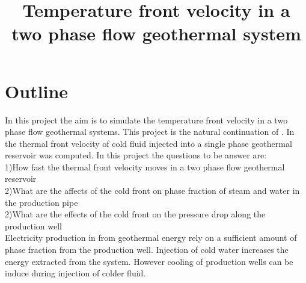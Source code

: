 \documentclass[
10pt, %
a4paper, %
oneside, %
headinclude,footinclude, %
BCOR5mm, %
]{scrartcl}
\title{Temperature front velocity in a two phase flow geothermal system} %
\author{\spacedlowsmallcaps{Yapi Donatien Achou}} %
\date{} %
\begin{document}

\renewcommand{\sectionmark}[1]{\markright{\spacedlowsmallcaps{#1}}} %
\lehead{\mbox{\llap{\small\thepage\kern1em\color{halfgray} \vline}\color{halfgray}\hspace{0.5em}\rightmark\hfil}} %

\pagestyle{scrheadings} %


\maketitle %







\section{Outline}
In this project the aim is to simulate the temperature front velocity in a two phase flow geothermal systems. This project is the natural continuation of \cite{Achou:2013}. In \cite{Achou:2013} the thermal front velocity of cold fluid injected into a single phase geothermal reservoir was computed. In this project the questions to be answer are: \\
1)How fast the thermal front velocity moves in a two phase flow geothermal reservoir \\
2)What are the affects of the cold front on phase fraction of steam and water in the production pipe\\
2)What are the effects of the cold front on the pressure drop along the production well\\
Electricity production in from geothermal energy rely on a sufficient amount of phase fraction from the production well. Injection of cold water increases the energy extracted from the system. However cooling of production wells can be induce during injection of colder fluid. 
\end{document}
